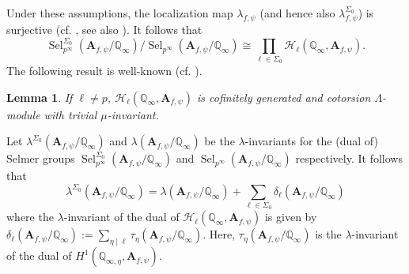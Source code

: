 \documentclass{amsart}
\newcommand{\Q}{\mathbb{Q}}
\newcommand{\bA}{\mathbf{A}}
\newcommand{\Sel}{\operatorname{Sel}}
\newtheorem{auxiliary proposition}[theorem]{Auxiliary Proposition}
\newtheorem{lemma}[theorem]{Lemma}
\newtheorem{main conjecture}[theorem]{Main Conjecture}
\newtheorem{main theorem}[theorem]{Main Theorem}
\newtheorem{modesty proposition}[theorem]{Modesty Proposition}
\newtheorem{open problem}[theorem]{Open Problem}
\newtheorem{convergence lemma}[theorem]{Convergence Lemma}
\newtheorem{corrected lemma}[theorem]{Corrected Lemma}
\newtheorem{growth lemma}[theorem]{Growth Lemma}
\newtheorem{coefficient lemma}[theorem]{Integrality Lemma}
\newtheorem{interpolation lemma}[theorem]{Interpolation Lemma}
\newtheorem{kernel lemma}[theorem]{Kernel Lemma}
\newtheorem{limit lemma}[theorem]{Limit Lemma}
\newtheorem{tandem lemma}[theorem]{Modesty Lemma}
\newtheorem{zero-finding lemma}[theorem]{Zero-Finding Lemma}
\begin{document}
Under these assumptions, the localization map $\lambda_{f, \psi}$ (and hence also ${\lambda_{f, \psi}^{\Sigma_0}}$) is surjective (cf. \cite[Corollary 2.3]{GreenbergVatsal}, see also \cite[Proposition 3.3]{RaySujathaVatsal}). It follows that 
\begin{equation}\label{eq:Sel1}
   \Sel_{p^\infty}^{\Sigma_0}(\bA_{f,\psi}/\Q_\infty)/ \Sel_{p^\infty}(\bA_{f,\psi}/\Q_\infty)\cong \prod_{\ell \in \Sigma_0}\mathcal{H}_{\ell}(\Q_\infty, \bA_{f, \psi}).
\end{equation}
The following result is well-known (cf. \cite[Lemma 3.5]{RaySujathaVatsal}).
\begin{lemma}\label{eq:Lemma1}
    If $ \ell \neq p$, $\mathcal{H}_{\ell}(\Q_\infty, \bA_{f, \psi})$ is cofinitely generated and cotorsion $\Lambda$-module with trivial $\mu$-invariant.
\end{lemma}
Let $\lambda^{\Sigma_0}(\bA_{f,\psi}/\Q_\infty)$  and $\lambda(\bA_{f,\psi}/\Q_\infty)$ be the $\lambda$-invariants for the (dual of) Selmer groups 
$\Sel_{p^\infty}^{\Sigma_0}(\bA_{f,\psi}/\Q_\infty)$ and $\Sel_{p^\infty}(\bA_{f,\psi}/\Q_\infty)$ respectively. It follows that 
\begin{equation}\label{eq: lambda}
    \lambda^{\Sigma_0}(\bA_{f,\psi}/\Q_\infty)=\lambda(\bA_{f,\psi}/\Q_\infty) +\sum_{\ell \in \Sigma_0} \delta_\ell(\bA_{f,\psi}/\Q_\infty)
\end{equation}
where the $\lambda$-invariant of the dual of $\mathcal{H}_{\ell}(\Q_\infty, \bA_{f, \psi})$ is given by $\delta_\ell(\bA_{f,\psi}/\Q_\infty):=\sum_{\eta \mid \ell} \tau_{\eta}(\bA_{f,\psi}/\Q_\infty)$. Here, $\tau_{\eta}(\bA_{f,\psi}/\Q_\infty)$ is the $\lambda$-invariant of  the dual of $H^1(\Q_{\infty, \eta}, \bA_{f, \psi})$.
\end{document}
